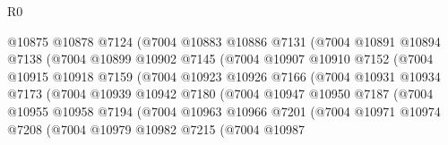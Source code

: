 \begin{lexlean}{R0}
\begin{coremodule}
                          @10875
                          @10878
                          @7124
                          (@7004
                            @10883
                            @10886
                            @7131
                            (@7004
                              @10891
                              @10894
                              @7138
                              (@7004
                                @10899
                                @10902
                                @7145
                                (@7004
                                  @10907
                                  @10910
                                  @7152
                                  (@7004
                                    @10915
                                    @10918
                                    @7159
                                    (@7004
                                      @10923
                                      @10926
                                      @7166
                                      (@7004
                                        @10931
                                        @10934
                                        @7173
                                        (@7004
                                          @10939
                                          @10942
                                          @7180
                                          (@7004
                                            @10947
                                            @10950
                                            @7187
                                            (@7004
                                              @10955
                                              @10958
                                              @7194
                                              (@7004
                                                @10963
                                                @10966
                                                @7201
                                                (@7004
                                                  @10971
                                                  @10974
                                                  @7208
                                                  (@7004
                                                    @10979
                                                    @10982
                                                    @7215
                                                    (@7004
                                                      @10987

\end{coremodule}
\end{lexlean}
